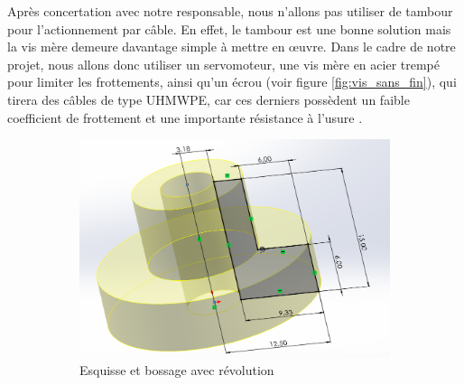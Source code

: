 \documentclass[a4paper, 11pt]{report}
\begin{document}
            Après concertation avec notre responsable, nous n'allons pas utiliser de tambour pour l'actionnement par câble. En effet, le tambour est une bonne solution mais la vis mère demeure davantage simple à mettre en œuvre. Dans le cadre de notre projet, nous allons donc utiliser un servomoteur, une vis mère en acier trempé pour limiter les frottements, ainsi qu'un écrou (voir figure \ref{fig:vis_sans_fin}), qui tirera des câbles de type UHMWPE, car ces derniers possèdent un faible coefficient de frottement et une importante résistance à l'usure \cite{wang_spirobs_2025}.

            \begin{figure}
                \centering
                \begin{subfigure}[t]{0.6\textwidth}
                    \centering
                    \includegraphics[width=\textwidth]{Figures/ecrou_esquisse.png}
                    \caption{Esquisse et bossage avec révolution}
                \end{subfigure}
                \hfill
                \begin{subfigure}[t]{0.3\textwidth}
                    \centering

\end{subfigure}
\end{figure}
\end{document}
